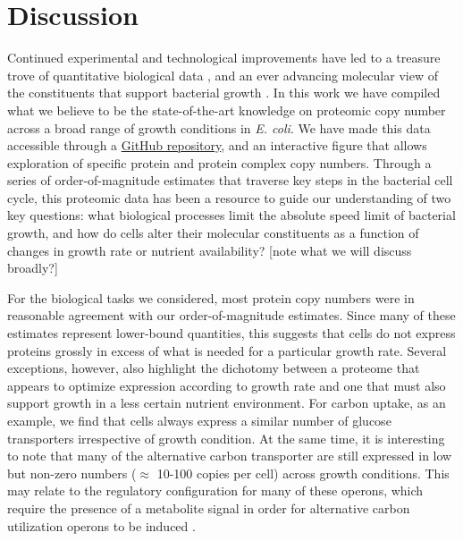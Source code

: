 \section{Discussion}
Continued experimental and technological improvements have led to a treasure
trove of quantitative biological data \citep{hui2015, schmidt2016, si2017}, and
an ever advancing molecular view of the constituents that support bacterial
growth \citep{taheriaraghi2015, morgenstein2015, si2019}. In this work we have
compiled what we believe to be the state-of-the-art knowledge on proteomic copy
number across a broad range of growth conditions in \textit{E. coli}. We have
made this data accessible through a
\href{https://github.com/RPGroup-PBoC/growth_limits}{GitHub repository}, and an
interactive figure that allows exploration of specific protein and protein
complex copy numbers. Through a series of order-of-magnitude estimates that
traverse key steps in the bacterial cell cycle, this proteomic data has been a
resource to guide our understanding of two key questions: what biological
processes limit the absolute speed limit of bacterial growth, and how do cells
alter their  molecular constituents as a function of changes in growth rate or
nutrient availability? [note what we will discuss broadly?]

For the biological tasks we considered, most protein copy numbers were in
reasonable agreement with our order-of-magnitude estimates. Since many of these
estimates represent lower-bound quantities, this suggests that cells do not
express proteins grossly in excess of what is needed for a particular growth
rate. Several exceptions, however, also highlight the dichotomy between a
proteome that appears to optimize expression according to growth rate and one
that must also support growth in a less certain nutrient environment. For carbon
uptake, as an example, we find that cells always express a similar number of
glucose transporters irrespective of growth condition. At the same time, it is
interesting to note that many of the alternative carbon transporter are still
expressed in low but non-zero numbers ($\approx$ 10-100 copies per cell) across
growth conditions. This may relate to the regulatory configuration for many of
these operons, which require the presence of a metabolite signal in order for
alternative carbon utilization operons to be induced \citep{monod1949,
laxhuber2020}.

